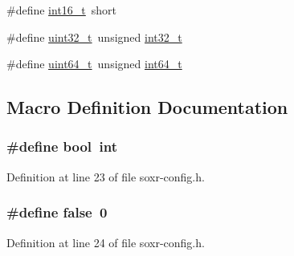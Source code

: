 \begin{DoxyCompactItemize}
\item 
\#define \hyperlink{lib-src_2libsoxr_2msvc_2soxr-config_8h_aba47ebc2ca6caf60d3de4971843aa4cf}{int16\+\_\+t}~short
\item 
\#define \hyperlink{lib-src_2libsoxr_2msvc_2soxr-config_8h_a0ddb3f43e52282b59ee55d059ed74a28}{uint32\+\_\+t}~unsigned \hyperlink{lib-src_2ffmpeg_2win32_2stdint_8h_a37994e3b11c72957c6f454c6ec96d43d}{int32\+\_\+t}
\item 
\#define \hyperlink{lib-src_2libsoxr_2msvc_2soxr-config_8h_a104204cb123abb831baa5adcfffc64e0}{uint64\+\_\+t}~unsigned \hyperlink{lib-src_2ffmpeg_2win32_2stdint_8h_a67a9885ef4908cb72ce26d75b694386c}{int64\+\_\+t}
\end{DoxyCompactItemize}


\subsection{Macro Definition Documentation}
\subsubsection[{\texorpdfstring{bool}{bool}}]{\setlength{\rightskip}{0pt plus 5cm}\#define bool~{\bf int}}\hypertarget{lib-src_2libsoxr_2msvc_2soxr-config_8h_abb452686968e48b67397da5f97445f5b}{}\label{lib-src_2libsoxr_2msvc_2soxr-config_8h_abb452686968e48b67397da5f97445f5b}


Definition at line 23 of file soxr-\/config.\+h.

\subsubsection[{\texorpdfstring{false}{false}}]{\setlength{\rightskip}{0pt plus 5cm}\#define false~0}\hypertarget{lib-src_2libsoxr_2msvc_2soxr-config_8h_a65e9886d74aaee76545e83dd09011727}{}\label{lib-src_2libsoxr_2msvc_2soxr-config_8h_a65e9886d74aaee76545e83dd09011727}


Definition at line 24 of file soxr-\/config.\+h.

